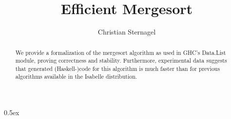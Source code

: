 \documentclass[11pt,a4paper]{article}
\begin{document}
\title{Efficient Mergesort}
\author{Christian Sternagel}
\maketitle

\begin{abstract}
We provide a formalization of the mergesort algorithm as used in GHC's Data.List module, proving correctness and stability. Furthermore, experimental data suggests that generated (Haskell-)code for this algorithm is much faster than for previous algorithms available in the Isabelle distribution.
\end{abstract}

\parindent 0pt\parskip 0.5ex





\end{document}
